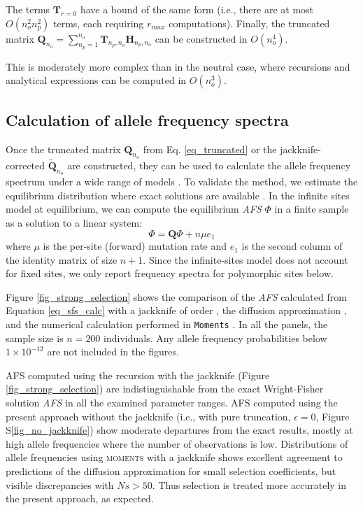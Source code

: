 \documentclass[review,nonatbib]{elsarticle}
\newcommand{\sgcomment}[1]{{\color{red}{SG: #1}}}
\begin{document}
The terms  $\mathbf{T}_{r=0}$ have a bound of the same form (i.e., there are at most $O(n_o^2 n_p^2)$
terms, each requiring $r_{max}$ computations).  Finally, the truncated matrix $\mathbf{Q}_{n_o} =
\sum_{n_p=1}^{n_{o}} \mathbf{T}_{n_p,n_o} \mathbf{H}_{n_p,n_o}$ can be constructed in $O(n_o^4)$.

This is moderately more complex than in the neutral case, where recursions \cite{BhaskarEtAl2014}
 and analytical expressions \cite{lessard2010recurrence} can be computed in $O(n_o^3).$


\subsection{Calculation of allele frequency spectra}
\label{subsec_afs}

Once the truncated matrix $\mathbf{Q}_{n_o}$ from Eq. \ref{eq_truncated} or 
the jackknife-corrected  $\tilde {\mathbf{Q}}_{n_o}$ are constructed, they can be
used to calculate the allele frequency spectrum under a wide range of models \cite{JouganousEtAl2017}. 
To validate the method, we estimate the equilibrium
distribution where exact solutions are available \citep{Krukov2016}. In the infinite sites model at
equilibrium, we can compute the equilibrium \textit{AFS} $\Phi$ in a finite sample as a solution to
a linear system:
\begin{equation}
  \label{eq_sfs_calc}
  \Phi = \mathbf{Q}\Phi  + n \mu e_1
\end{equation}
where $\mu$ is the per-site (forward) mutation rate and $e_1$ is the second column of the identity
matrix of size $n+1.$ Since the infinite-sites model does not account for fixed sites,
we only report frequency spectra for polymorphic sites below.

Figure \ref{fig_strong_selection} shows the comparison of the \textit{AFS} calculated from Equation
\ref{eq_sfs_calc} with a jackknife of order \sgcomment{3},
the diffusion approximation \cite[eq. 9.23]{Ewens2004}, and the numerical
calculation performed in \texttt{Moments} \citep{JouganousEtAl2017}. In all the panels, the sample
size is $n=200$ individuals. Any allele frequency probabilities below $1\times10^{-12}$ are not
included in the figures. 

AFS computed using the recursion with the jackknife (Figure \ref{fig_strong_selection}) are 
indistinguishable from the exact Wright-Fisher solution \textit{AFS} in all the examined 
parameter ranges. AFS computed using the present approach without the jackknife 
(i.e., with pure truncation, $\epsilon = 0$, Figure S\ref{fig_no_jackknife}) show moderate departures from the exact results, 
mostly at high allele frequencies where the number of observations is low. 
Distributions of allele frequencies using \textsc{moments} with a jackknife shows 
excellent agreement to predictions of the diffusion approximation for small selection 
coefficients, but visible discrepancies with $Ns>50.$ Thus selection is treated more 
accurately in the present approach, as expected. 
\end{document}
